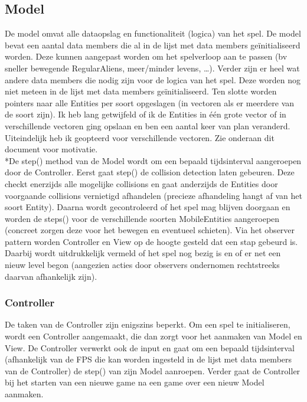 \documentclass[11pt, a4paper]{article}
\begin{document}
\subsection{Model}
De model omvat alle dataopslag en functionaliteit (logica) van het spel. De model bevat een aantal data members die al in de lijst met data members ge\"initialiseerd worden. Deze kunnen aangepast worden om het spelverloop aan te passen (bv sneller bewegende RegularAliens, meer/minder levens, \ldots). Verder zijn er heel wat andere data members die nodig zijn voor de logica van het spel. Deze worden nog niet meteen in de lijst met data members ge\"initialiseerd. Ten slotte worden pointers naar alle Entities per soort opgeslagen (in vectoren als er meerdere van de soort zijn). Ik heb lang getwijfeld of ik de Entities in \'e\'en grote vector of in verschillende vectoren ging opslaan en ben een aantal keer van plan veranderd. Uiteindelijk heb ik geopteerd voor verschillende vectoren. Zie onderaan dit document voor motivatie.
\\*De step() method van de Model wordt om een bepaald tijdsinterval aangeroepen door de Controller. Eerst gaat step() de collision detection laten gebeuren. Deze checkt enerzijds alle mogelijke collisions en gaat anderzijds de Entities door voorgaande collisions vernietigd afhandelen (precieze afhandeling hangt af van het soort Entity). Daarna wordt gecontroleerd of het spel mag blijven doorgaan en worden de steps() voor de verschillende soorten MobileEntities aangeroepen (concreet zorgen deze voor het bewegen en eventueel schieten). Via het observer pattern worden Controller en View op de hoogte gesteld dat een stap gebeurd is. Daarbij wordt uitdrukkelijk vermeld of het spel nog bezig is en of er net een nieuw level begon (aangezien acties door observers ondernomen rechtstreeks daarvan afhankelijk zijn).
\subsubsection{Controller}
De taken van de Controller zijn enigszins beperkt. Om een spel te initialiseren, wordt een Controller aangemaakt, die dan zorgt voor het aanmaken van Model en View. De Controller verwerkt ook de input en gaat om een bepaald tijdsinterval (afhankelijk van de FPS die kan worden ingesteld in de lijst met data members van de Controller) de step() van zijn Model aanroepen. Verder gaat de Controller bij het starten van een nieuwe game na een game over een nieuw Model aanmaken.
\end{document}
